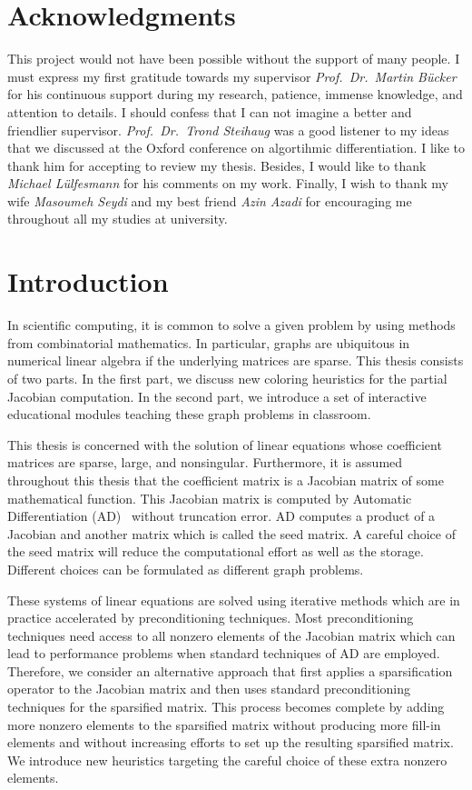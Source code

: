 \documentclass[12pt, twoside,a4paper,toc=bibliography]{scrbook}
\begin{document}
\chapter*{Acknowledgments}
\noindent This project would not have been possible without the support of many people. I must
express my first gratitude towards my supervisor \textit{Prof.\ Dr.\ Martin B\"ucker} for his
continuous support during my research, patience, immense knowledge, and attention to details. I
should confess that I can not imagine a better and friendlier supervisor. \textit{Prof.\ Dr.\ Trond
Steihaug} was a good listener to my ideas that we discussed at the Oxford conference on
algortihmic differentiation. I like to thank him for accepting to review my thesis. Besides, I would like
to thank \textit{Michael Lülfesmann} for his comments on my work. Finally, I wish to thank my wife
\textit{Masoumeh Seydi} and my best friend \textit{Azin Azadi} for encouraging me throughout all
my studies at university.

\tableofcontents
\chapter{Introduction}
In scientific computing, it is common to solve a given problem by using methods from combinatorial mathematics.
In particular, graphs are ubiquitous in numerical linear algebra if the underlying matrices are sparse.
This thesis consists of two parts.
In the first part, we discuss new coloring heuristics for the partial Jacobian computation.
In the second part, we introduce a set of interactive educational modules teaching these graph problems in classroom.

This thesis is concerned with
the solution of linear equations whose coefficient matrices are sparse, large, and nonsingular.
Furthermore, it is assumed throughout this thesis that the coefficient matrix is a
Jacobian matrix of some mathematical function.
This Jacobian matrix is computed by Automatic Differentiation (AD)~\cite{Griewank2008EDP,Rall1981ADT} without truncation error.
AD computes a product of a Jacobian and another matrix which is called the seed matrix.
A careful choice of the seed matrix will reduce the computational effort as well as
the storage. Different choices can be formulated as different graph problems.

These systems of linear equations are solved using iterative methods which are in practice
accelerated by preconditioning techniques. Most preconditioning techniques need access to all
nonzero elements of the Jacobian matrix which can lead to performance problems when standard
techniques of AD are employed. Therefore, we consider an alternative approach that first applies a
sparsification operator to the Jacobian matrix and then uses standard preconditioning techniques
for the sparsified matrix. This process becomes complete by adding more nonzero elements to the
sparsified matrix without producing more fill-in elements and without increasing efforts to set up
the resulting sparsified matrix. We introduce new heuristics targeting the careful choice of these
extra nonzero elements.
\end{document}
